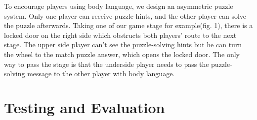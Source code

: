 \documentclass{chi-ext}
\begin{document}
To encourage players using body language, we design an asymmetric puzzle system. Only one player can receive puzzle hints, and the other player can solve the puzzle afterwards.
Taking one of our game stage for example(fig. 1), there is a locked door on the right side which obstructs both players' route to the next stage. 
The upper side player can't see the puzzle-solving hints but he can turn the wheel to the match puzzle answer, which opens the locked door.
The only way to pass the stage is that the underside player needs to pass the puzzle-solving message to the other player with body language. 


\section{Testing and Evaluation}

\end{document}
